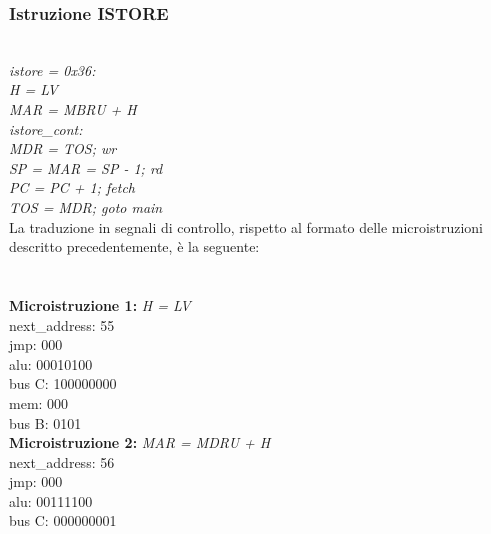 \documentclass[12pt]{article}
\begin{document}
\subsubsection{Istruzione ISTORE}
\textit{
    \\istore = 0x36:
    \\\hspace*{2cm} H = LV
    \\\hspace*{2cm} MAR = MBRU + H
    \\istore\_cont:
    \\\hspace*{2cm} MDR = TOS; wr
    \\\hspace*{2cm} SP = MAR = SP - 1; rd
    \\\hspace*{2cm} PC = PC + 1; fetch
    \\\hspace*{2cm} TOS = MDR; goto main
}
\vspace*{1cm}\\La traduzione in segnali di controllo, rispetto al formato delle microistruzioni descritto precedentemente, è la seguente:
\\\\\\\textbf{Microistruzione 1:}	\hspace*{1cm} \textit{H = LV}
\\\hspace*{1cm} next\_address: 55
\\\hspace*{1cm} jmp: 000
\\\hspace*{1cm} alu: 00010100
\\\hspace*{1cm} bus C: 100000000
\\\hspace*{1cm} mem: 000
\\\hspace*{1cm} bus B: 0101
\\ \textbf{Microistruzione 2:}	\hspace*{1cm} \textit{MAR = MDRU + H}
\\\hspace*{1cm} next\_address: 56
\\\hspace*{1cm} jmp: 000
\\\hspace*{1cm} alu: 00111100
\\\hspace*{1cm} bus C: 000000001
\end{document}

